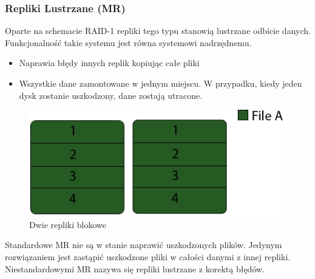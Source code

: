 \subsubsection{Repliki Lustrzane (MR)}
Oparte na schemacie RAID-1 repliki tego typu stanowią lustrzane odbicie danych. Funkcjonalność takie systemu jest równa systemowi nadrzędnemu. 
\begin{itemize}
        \item Naprawia błędy innych replik kopiując całe pliki
        \item Wszystkie dane zamontowane w jednym miejscu. W przypadku, kiedy jeden dysk zostanie uszkodzony, dane zostają utracone.
\end{itemize}

\begin{figure}[h!]
        \centering
        \includegraphics{raid-1.png}
        \caption{Dwie repliki blokowe}
        \label{fig:raid1}
\end{figure}

Standardowe MR nie są w stanie naprawić uszkodzonych plików. Jedynym rozwiązaniem jest zastąpić uszkodzone pliki w całości danymi z innej repliki. Niestandardowymi MR nazywa się repliki lustrzane z korektą błędów.
